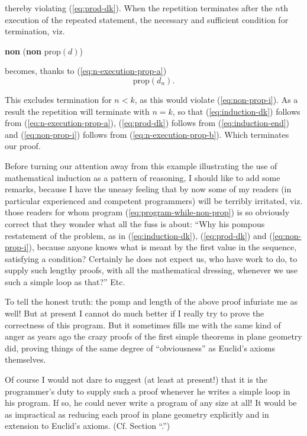 \noindent 
thereby violating (\ref{eq:prod-dk}). When the repetition terminates after the $n$th execution of the repeated statement, the necessary and sufficient condition for termination, viz.
\begin{center}
	\textbf{non} (\textbf{non} prop$(d)$)
\end{center}

\noindent
becomes, thanks to (\ref{eq:n-execution-prop-a})
\begin{equation}
	\label{eq:induction-end}
	\text{prop}(d_n).
\end{equation}

This excludes termination for $n < k$, as this would violate (\ref{eq:non-prop-i}). As a result the repetition will terminate with $n = k$, so that (\ref{eq:induction-dk}) follows from (\ref{eq:n-execution-prop-a}), (\ref{eq:prod-dk}) follows from (\ref{eq:induction-end}) and (\ref{eq:non-prop-i}) follows from (\ref{eq:n-execution-prop-b}). Which terminates our proof.

Before turning our attention away from this example illustrating the use of mathematical induction as a pattern of reasoning, I should like to add some remarks, because I have the uneasy feeling that by now some of my readers (in particular experienced and competent programmers) will be terribly irritated, viz. those readers for whom program (\ref{eq:program-while-non-prop}) is so obviously correct that they wonder what all the fuss is about: ``Why his pompous restatement of the problem, as in (\ref{eq:induction-dk}), (\ref{eq:prod-dk}) and (\ref{eq:non-prop-i}), because anyone knows what is meant by the first value in the sequence, satisfying a condition? Certainly he does not expect us, who have work to do, to supply such lengthy proofs, with all the mathematical dressing, whenever we use such a simple loop as that?'' Etc.

To tell the honest truth: the pomp and length of the above proof infuriate me as well! But at present I cannot do much better if I really try to prove the correctness of this program. But it sometimes fills me with the same kind of anger as years ago the crazy proofs of the first simple theorems in plane geometry did, proving things of the same degree of ``obviousness'' as Euclid's axioms themselves.

Of course I would not dare to suggest (at least at present!) that it is the programmer's duty to supply such a proof whenever he writes a simple loop in his program. If so, he could never write a program of any size at all! It would be as impractical as reducing each proof in plane geometry explicitly and in extension to Euclid's axioms. (Cf. Section ``.'')

